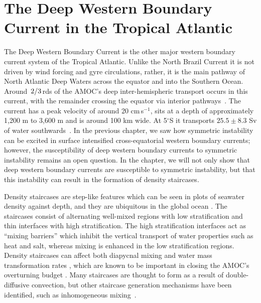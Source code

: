 \section{The Deep Western Boundary Current in the Tropical Atlantic}
\label{sec:DWBCIntro}
The Deep Western Boundary Current is the other major western boundary current system of the Tropical Atlantic. Unlike the North Brazil Current it is not driven by wind forcing and gyre circulations, rather, it is the main pathway of North Atlantic Deep Waters across the equator and into the Southern Ocean. Around $\flatfrac{2}{3}$rds of the AMOC's deep inter-hemispheric transport occurs in this current, with the remainder crossing the equator via interior pathways~\citep{Bower2019}. The current has a peak velocity of around 20 cm\,s$^{-1}$, sits at a depth of approximately 1,200 m to 3,600 m and is around 100 km wide. At 5$^\circ$S it transports $25.5\pm8.3$ Sv of water southwards~\citep{Schott2005}. In the previous chapter, we saw how symmetric instability can be excited in surface intensified cross-equatorial western boundary currents; however, the susceptibility of deep western boundary currents to symmetric instability remains an open question. In the chapter, we will not only show that deep western boundary currents are susceptible to symmetric instability, but that this instability can result in the formation of density staircases.

Density staircases are step-like features which can be seen in plots of seawater density against depth, and they are ubiquitous in the global ocean \citep{Stern1960,Schmitt1987,Melling1984,Tait1968,Johannessen1974,Lambert1977}. The staircases consist of alternating well-mixed regions with low stratification and thin interfaces with high stratification. The high stratification interfaces act as ``mixing barriers'' which inhibit the vertical transport of water properties such as heat and salt, whereas mixing is enhanced in the low stratification regions. Density staircases can affect both diapycnal mixing and water mass transformation rates \citep{Schmitt2005}, which are known to be important in closing the AMOC's overturning budget \citep{DeLavergne2022}. Many staircases are thought to form as a result of double-diffusive convection, but other staircase generation mechanisms have been identified, such as inhomogeneous mixing~\citep{Balmforth1998}.



